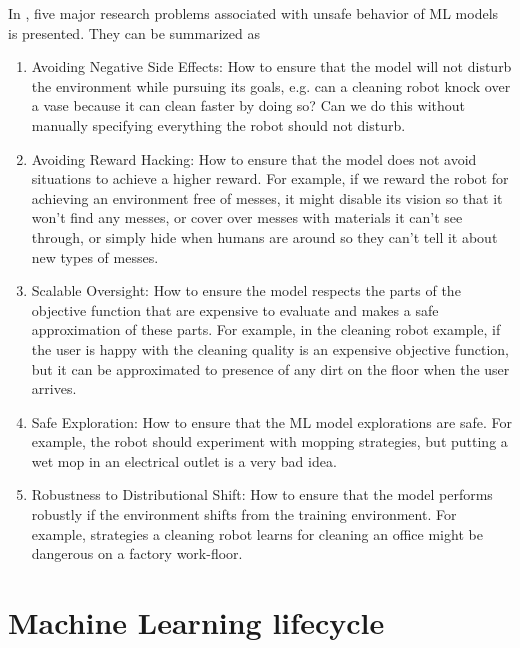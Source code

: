 % 
In \cite{Amodei2016}, five major research problems associated with unsafe behavior of ML models is presented. They can be summarized as
\begin{enumerate}
	\item Avoiding Negative Side Effects: How to ensure that the model will not disturb the environment while pursuing its goals, e.g. can a cleaning robot knock over a vase because it can clean faster by doing so? Can we do this without manually specifying everything the robot should not disturb.
	
	\item Avoiding Reward Hacking: How to ensure that the model does not avoid situations to achieve a higher reward. For example, if we reward the robot for achieving an environment free of messes, it might disable its vision so that it won’t find any messes, or cover over messes with materials it can’t see through, or simply hide when humans are around so they can’t tell it about new types of messes.
	
	\item Scalable Oversight: How to ensure the model respects the parts of the objective function that are expensive to evaluate and makes a safe approximation of these parts. 
	For example, in the cleaning robot example, if the user is happy with the cleaning quality is an expensive objective function, but it can be approximated to presence of any dirt on the floor when the user arrives.
	
	\item Safe Exploration: How to ensure that the ML model explorations are safe. For example, the robot should experiment with mopping strategies, but putting a wet mop in an electrical outlet is a very bad idea.
	
	\item Robustness to Distributional Shift: How to ensure that the model performs robustly if the environment shifts from the training environment. For example, strategies a cleaning robot learns for cleaning an office might be dangerous on a factory work-floor.

\end{enumerate}

\section{Machine Learning lifecycle}

